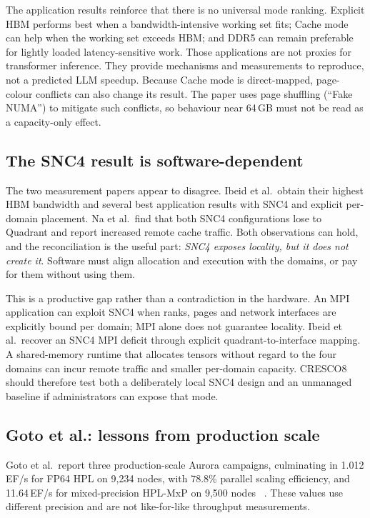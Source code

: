 The application results reinforce that there is no universal mode
ranking.  Explicit HBM performs best when a bandwidth-intensive working
set fits; Cache mode can help when the working set exceeds HBM; and DDR5
can remain preferable for lightly loaded latency-sensitive work.  Those
applications are not proxies for transformer inference.  They provide
mechanisms and measurements to reproduce, not a predicted LLM speedup.
Because Cache mode is direct-mapped, page-colour conflicts can also
change its result.  The paper uses page shuffling (``Fake NUMA'') to
mitigate such conflicts, so behaviour near 64\,GB must not be read as a
capacity-only effect.


\subsection{The SNC4 result is software-dependent}
\label{sec:snc4-synthesis}

The two measurement papers appear to disagree.  Ibeid et al.\ obtain
their highest HBM bandwidth and several best application results with
SNC4 and explicit per-domain placement.  Na et al.\ find that both SNC4
configurations lose to Quadrant and report increased remote cache
traffic.  Both observations can hold, and the reconciliation is the useful part:
\emph{SNC4 exposes locality, but it does not create it}.  Software must
align allocation and execution with the domains, or pay for them
without using them.

This is a productive gap rather than a contradiction in the hardware.
An MPI application can exploit SNC4 when ranks, pages and network
interfaces are explicitly bound per domain; MPI alone does not
guarantee locality.  Ibeid et al.\ recover an SNC4 MPI deficit through
explicit quadrant-to-interface mapping.  A shared-memory runtime that
allocates tensors without regard to the four domains can incur remote
traffic and smaller per-domain capacity.  CRESCO8 should therefore test
both a deliberately local SNC4 design and an unmanaged baseline if
administrators can expose that mode.

\subsection{Goto et al.: lessons from production scale}

Goto et al.\ report three production-scale Aurora campaigns, culminating in
1.012\,EF/s for FP64 HPL on 9,234 nodes, with 78.8\% parallel scaling
efficiency, and
11.64\,EF/s for mixed-precision HPL-MxP on 9,500 nodes
~\cite{goto2026aurorahpl}.  These values use different precision and are
not like-for-like throughput measurements.

